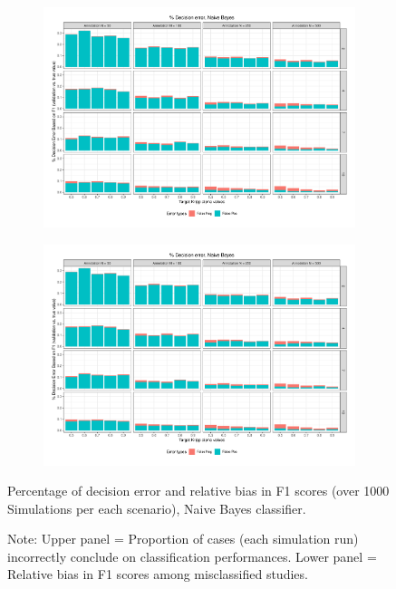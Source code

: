 \documentclass[man, 12pt, a4paper, nolmodern, noextraspace]{apa6}
\begin{document}
\begin{figure}
    \centering
    \begin{subfigure}[t]{0.95\textwidth}
        \centering
        \includegraphics[clip, width=\linewidth, page = 1]{Results/BAYES_summary_05.pdf} 
    \end{subfigure}
    \begin{subfigure}[t]{0.95\textwidth}
        \centering
        \captionsetup{font=small}
        \includegraphics[clip, width=\linewidth, page = 2]{Results/BAYES_summary_05.pdf} 
    \end{subfigure}
    
    \captionsetup{format=hang}
    \caption{Percentage of decision error and relative bias in F1 scores (over 1000 Simulations per each scenario), Naive Bayes classifier.} 
    \label{fig:Figure2}
    \captionsetup{font=small}
    \caption*{Note: Upper panel = Proportion of cases (each simulation run) incorrectly conclude on classification performances. Lower panel = Relative bias in F1 scores among misclassified studies.}
\end{figure}          
\end{document}
